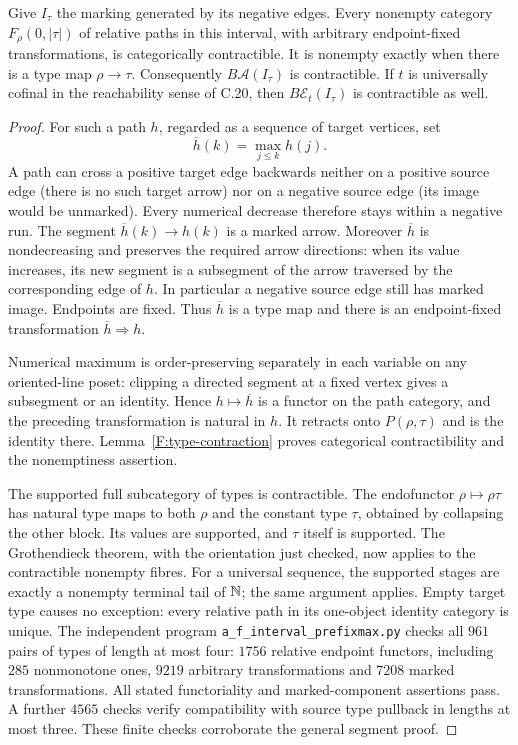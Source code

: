 \begin{lemma}
\label{F:relative-interval}
Give $I_\tau$ the marking generated by its negative edges. Every
nonempty category $F_\rho(0,|\tau|)$ of relative paths in this interval,
with arbitrary endpoint-fixed transformations, is categorically
contractible. It is nonempty exactly when there is a type map
$\rho\to\tau$. Consequently $B\mathcal A(I_\tau)$ is contractible.
If $t$ is universally cofinal in the reachability sense of C.20, then
$B\mathcal E_t(I_\tau)$ is contractible as well.
\end{lemma}
\begin{proof}
For such a path $h$, regarded as a sequence of target vertices, set
\[
 \overline h(k)=\max_{j\leq k}h(j).
\]
A path can cross a positive target edge backwards neither on a
positive source edge (there is no such target arrow) nor on a negative
source edge (its image would be unmarked). Every numerical decrease
therefore stays within a negative run. The segment
$\overline h(k)\to h(k)$ is a marked arrow. Moreover
$\overline h$ is nondecreasing and preserves the required arrow
directions: when its value increases, its new segment is a subsegment
of the arrow traversed by the corresponding edge of $h$. In particular
a negative source edge still has marked image. Endpoints are fixed.
Thus $\overline h$ is a type map and there is an endpoint-fixed
transformation $\overline h\Rightarrow h$.

Numerical maximum is order-preserving separately in each variable on
any oriented-line poset: clipping a directed segment at a fixed
vertex gives a subsegment or an identity. Hence $h\mapsto\overline h$
is a functor on the path category, and the preceding transformation
is natural in $h$. It retracts onto $P(\rho,\tau)$ and is the identity
there. Lemma~\ref{F:type-contraction} proves categorical
contractibility and the nonemptiness assertion.

The supported full subcategory of types is contractible. The
endofunctor $\rho\mapsto\rho\tau$ has natural type maps to both
$\rho$ and the constant type $\tau$, obtained by collapsing the
other block. Its values are supported, and $\tau$ itself is supported.
The Grothendieck theorem, with the orientation just checked, now
applies to the contractible nonempty fibres. For a universal sequence,
the supported stages are exactly a nonempty terminal tail of $\mathbb N$;
the same argument applies. Empty target type causes no exception:
every relative path in its one-object identity category is unique.
The independent program \texttt{a\_f\_interval\_prefixmax.py} checks
all $961$ pairs of types of length at most four: $1756$ relative
endpoint functors, including $285$ nonmonotone ones, $9219$ arbitrary
transformations and $7208$ marked transformations. All stated
functoriality and marked-component assertions pass. A further $4565$
checks verify compatibility with source type pullback in lengths at
most three. These finite checks corroborate the general segment proof.
\end{proof}

